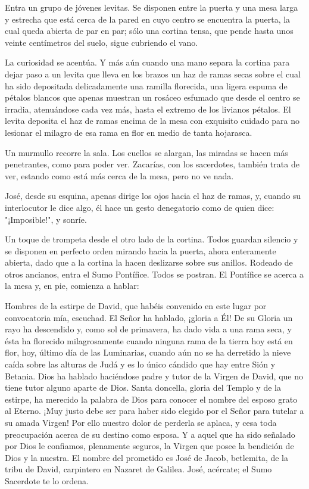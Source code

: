 \documentclass[12pt]{book} %
\begin{document}
Entra un grupo de jóvenes levitas. Se disponen entre la puerta y una mesa larga y estrecha que está cerca de la pared en cuyo centro se encuentra la puerta, la cual queda abierta de par en par; sólo una cortina tensa, que pende hasta unos veinte centímetros del suelo, sigue cubriendo el vano. 

La curiosidad se acentúa. Y más aún cuando una mano separa la cortina para dejar paso a un levita que lleva en los brazos un haz de ramas secas sobre el cual ha sido depositada delicadamente una ramilla florecida, una ligera espuma de pétalos blancos que apenas muestran un rosáceo esfumado que desde el centro se irradia, atenuándose cada vez más, hasta el extremo de los livianos pétalos. El levita deposita el haz de ramas encima de la mesa con exquisito cuidado para no lesionar el milagro de esa rama en flor en medio de tanta hojarasca. 

Un murmullo recorre la sala. Los cuellos se alargan, las miradas se hacen más penetrantes, como para poder ver. Zacarías, con los sacerdotes, también trata de ver, estando como está más cerca de la mesa, pero no ve nada. 

José, desde su esquina, apenas dirige los ojos hacia el haz de ramas, y, cuando su interlocutor le dice algo, él hace un gesto denegatorio como de quien dice: "¡Imposible!", y sonríe. 

Un toque de trompeta desde el otro lado de la cortina. Todos guardan silencio y se disponen en perfecto orden mirando hacia la puerta, ahora enteramente abierta, dado que a la cortina la hacen deslizarse sobre sus anillos. Rodeado de otros ancianos, entra el Sumo Pontífice. Todos se postran. El Pontífice se acerca a la mesa y, en pie, comienza a hablar: 

Hombres de la estirpe de David, que habéis convenido en este lugar por convocatoria mía, escuchad. El Señor ha hablado, ¡gloria a Él! De su Gloria un rayo ha descendido y, como sol de primavera, ha dado vida a una rama seca, y ésta ha florecido milagrosamente cuando ninguna rama de la tierra hoy está en flor, hoy, último día de las Luminarias, cuando aún no se ha derretido la nieve caída sobre las alturas de Judá y es lo único cándido que hay entre Sión y Betania. Dios ha hablado haciéndose padre y tutor de la Virgen de David, que no tiene tutor alguno aparte de Dios. Santa doncella, gloria del Templo y de la estirpe, ha merecido la palabra de Dios para conocer el nombre del esposo grato al Eterno. ¡Muy justo debe ser para haber sido elegido por el Señor para tutelar a su amada Virgen! Por ello nuestro dolor de perderla se aplaca, y cesa toda preocupación acerca de su destino como esposa. Y a aquel que ha sido señalado por Dios le confiamos, plenamente seguros, la Virgen que posee la bendición de Dios y la nuestra. El nombre del prometido es José de Jacob, betlemita, de la tribu de David, carpintero en Nazaret de Galilea. José, acércate; el Sumo Sacerdote te lo ordena. 
\end{document}
